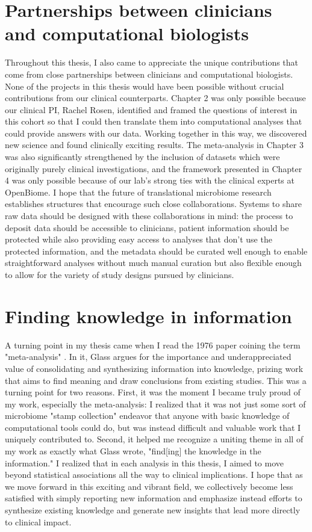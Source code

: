 \section{Partnerships between clinicians and computational biologists}

Throughout this thesis, I also came to appreciate the unique contributions that come from close partnerships between clinicians and computational biologists.
None of the projects in this thesis would have been possible without crucial contributions from our clinical counterparts.
Chapter 2 was only possible because our clinical PI, Rachel Rosen, identified and framed the questions of interest in this cohort so that I could then translate them into computational analyses that could provide answers with our data.
Working together in this way, we discovered new science and found clinically exciting results.
The meta-analysis in Chapter 3 was also significantly strengthened by the inclusion of datasets which were originally purely clinical investigations, and the framework presented in Chapter 4 was only possible because of our lab's strong ties with the clinical experts at OpenBiome.
I hope that the future of translational microbiome research establishes structures that encourage such close collaborations.
Systems to share raw data should be designed with these collaborations in mind: the process to deposit data should be accessible to clinicians, patient information should be protected while also providing easy access to analyses that don't use the protected information, and the metadata should be curated well enough to enable straightforward analyses without much manual curation but also flexible enough to allow for the variety of study designs pursued by clinicians.

\section{Finding knowledge in information}

A turning point in my thesis came when I read the 1976 paper coining the term "meta-analysis" \cite{glass-1976}.
In it, Glass argues for the importance and underappreciated value of consolidating and synthesizing information into knowledge, prizing work that aims to find meaning and draw conclusions from existing studies.
This was a turning point for two reasons.
First, it was the moment I became truly proud of my work, especially the meta-analysis: I realized that it was not just some sort of microbiome "stamp collection" endeavor that anyone with basic knowledge of computational tools could do, but was instead difficult and valuable work that I uniquely contributed to.
Second, it helped me recognize a uniting theme in all of my work as exactly what Glass wrote, "find[ing] the knowledge in the information."
I realized that in each analysis in this thesis, I aimed to move beyond statistical associations all the way to clinical implications.
I hope that as we move forward in this exciting and vibrant field, we collectively become less satisfied with simply reporting new information and emphasize instead efforts to synthesize existing knowledge and generate new insights that lead more directly to clinical impact.

\begin{singlespace}


\end{singlespace}
